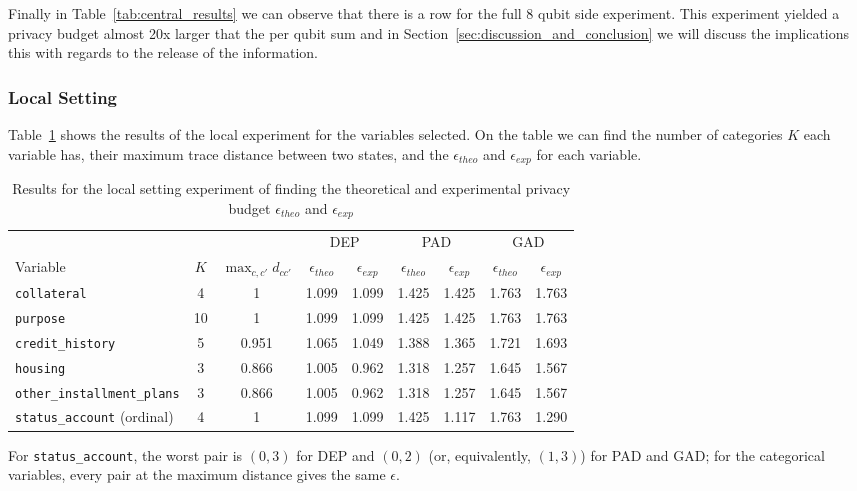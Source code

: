 \documentclass{ieeeaccess}
\begin{document}
Finally in Table~\ref{tab:central_results} we can observe that there is a row for the full 8 qubit side experiment. This experiment yielded a privacy budget almost 20x larger that the per qubit sum and in Section~\ref{sec:discussion_and_conclusion} we will discuss the implications this with regards to the release of the information.

\subsubsection{Local Setting}

Table~\ref{tab:local_results} shows the results of the local experiment for the variables selected. On the table we can find the number of categories $K$ each variable has, their maximum trace distance between two states, and the $\epsilon_{theo}$ and $\epsilon_{exp}$ for each variable.

\begin{table}[!t]
  \caption{Results for the local setting experiment of finding the theoretical and experimental privacy budget $\epsilon_{theo}$ and $\epsilon_{exp}$}
  \label{tab:local_results}
  \centering
  \begin{tabular}{lcccccccc}
    \toprule
     & & & \multicolumn{2}{c}{DEP} & \multicolumn{2}{c}{PAD} & \multicolumn{2}{c}{GAD} \\
    \cmidrule(lr){4-5} \cmidrule(lr){6-7} \cmidrule(l){8-9}
    Variable & $K$ & $\max_{c,c'} d_{cc'}$ & $\epsilon_{theo}$ & $\epsilon_{exp}$ & $\epsilon_{theo}$ & $\epsilon_{exp}$ & $\epsilon_{theo}$ & $\epsilon_{exp}$ \\
    \midrule
    \texttt{collateral}                        & 4  & 1     & 1.099 & 1.099 & 1.425 & 1.425 & 1.763 & 1.763 \\
    \texttt{purpose}                           & 10 & 1     & 1.099 & 1.099 & 1.425 & 1.425 & 1.763 & 1.763 \\
    \texttt{credit\_history}                   & 5  & 0.951 & 1.065 & 1.049 & 1.388 & 1.365 & 1.721 & 1.693 \\
    \texttt{housing}                           & 3  & 0.866 & 1.005 & 0.962 & 1.318 & 1.257 & 1.645 & 1.567 \\
    \texttt{other\_installment\_plans}         & 3  & 0.866 & 1.005 & 0.962 & 1.318 & 1.257 & 1.645 & 1.567 \\
    \texttt{status\_account} (ordinal)         & 4  & 1     & 1.099 & 1.099 & 1.425 & 1.117 & 1.763 & 1.290 \\
    \bottomrule
  \end{tabular}
  \par\smallskip
  {\footnotesize For \texttt{status\_account}, the worst pair is $(0,3)$ for DEP and $(0,2)$ (or, equivalently, $(1,3)$) for PAD and GAD; for the categorical variables, every pair at the maximum distance gives the same $\epsilon$.\par}
\end{table}
\end{document}
